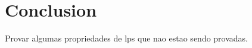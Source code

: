 \section{Conclusion}\label{seq:conclusion}
Provar algumas propriedades de lps que nao estao sendo provadas.


